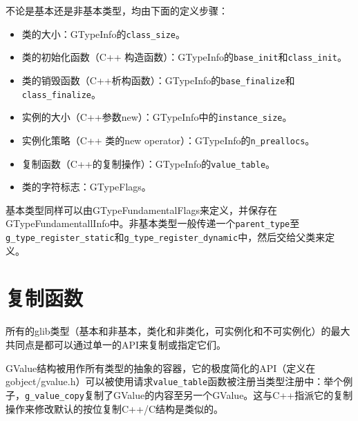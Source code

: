 不论是基本还是非基本类型，均由下面的定义步骤：
\begin{itemize}
	\item 类的大小：GTypeInfo的\verb|class_size|。
	\item 类的初始化函数（C++ 构造函数）：GTypeInfo的\verb|base_init|和\verb|class_init|。
	\item 类的销毁函数（C++析构函数）：GTypeInfo的\verb|base_finalize|和\verb|class_finalize|。
	\item 实例的大小（C++参数new）：GTypeInfo中的\verb|instance_size|。
	\item 实例化策略（C++ 类的new operator）：GTypeInfo的\verb|n_preallocs|。
	\item 复制函数（C++的复制操作）：GTypeInfo的\verb|value_table|。
	\item 类的字符标志：GTypeFlags。
\end{itemize}
基本类型同样可以由GTypeFundamentalFlags来定义，并保存在GTypeFundamentallInfo中。非基本类型一般传递一个\verb|parent_type|至\verb|g_type_register_static|和\verb|g_type_register_dynamic|中，然后交给父类来定义。
\section{复制函数}
所有的glib类型（基本和非基本，类化和非类化，可实例化和不可实例化）的最大共同点是都可以通过单一的API来复制或指定它们。

GValue结构被用作所有类型的抽象的容器，它的极度简化的API（定义在gobject/gvalue.h）可以被使用请求\verb|value_table|函数被注册当类型注册中：举个例子，\verb|g_value_copy|复制了GValue的内容至另一个GValue。这与C++指派它的复制操作来修改默认的按位复制C++/C结构是类似的。

